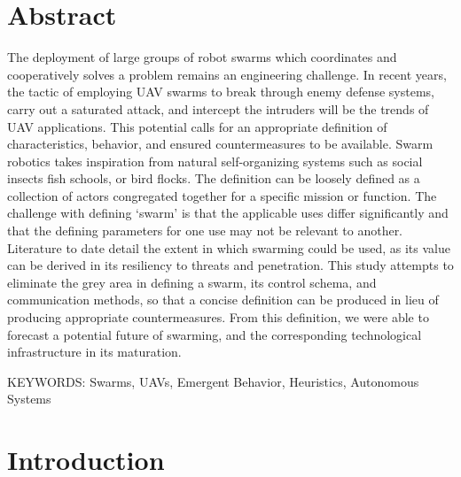 \section*{Abstract}
The deployment of large groups of robot swarms which coordinates and cooperatively solves a
problem remains an engineering challenge. In recent years, the tactic of employing UAV swarms to
break through enemy defense systems, carry out a saturated attack, and intercept the intruders will
be the trends of UAV applications. This potential calls for an appropriate definition of characteristics, behavior, and ensured countermeasures to be available. Swarm robotics takes inspiration from
natural self-organizing systems such as social insects fish schools, or bird flocks. The definition can
be loosely defined as a collection of actors congregated together for a specific mission or function. The challenge with defining ‘swarm’ is that the applicable uses differ significantly and that the defining parameters for one use may not be relevant to another. Literature to date detail the extent in which swarming could be used, as its value can be derived in its resiliency to threats and penetration. This study attempts to eliminate the grey area in defining a swarm, its control schema, and communication methods, so that a concise definition can be produced in lieu of producing appropriate countermeasures. From this definition, we were able to forecast a potential future of swarming, and the corresponding technological infrastructure in its maturation.


KEYWORDS: Swarms, UAVs, Emergent Behavior, Heuristics, Autonomous Systems


\section*{Introduction}

